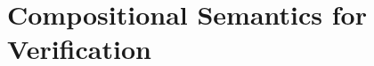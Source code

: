 \documentclass[acmsmall,screen,review,anonymous]{acmart}
\begin{document}
%
%
%
%


\section{Compositional Semantics for Verification} \label{sec:overview} %
\end{document}
